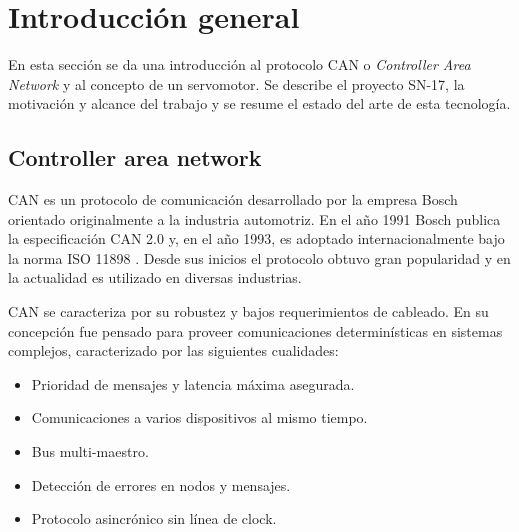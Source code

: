 
\chapter{Introducción general} %

\label{Chapter1} %
\label{IntroGeneral}


\newcommand{\keyword}[1]{\textbf{#1}}
\newcommand{\tabhead}[1]{\textbf{#1}}
\newcommand{\code}[1]{\texttt{#1}}
\newcommand{\file}[1]{\texttt{\bfseries#1}}
\newcommand{\option}[1]{\texttt{\itshape#1}}
\newcommand{\grados}{$^{\circ}$}

En esta sección se da una introducción al protocolo CAN o \textit{Controller Area Network}\citep{web_cia_can} y al concepto de un servomotor. Se describe el proyecto SN-17, la motivación y alcance del trabajo y se resume el estado del arte de esta tecnología.

\section{Controller area network}

CAN es un protocolo de comunicación desarrollado por la empresa Bosch \citep{can_basics_microchip} orientado originalmente a la industria automotriz. En el año 1991 Bosch publica la especificación CAN 2.0 y, en el año 1993, es adoptado internacionalmente bajo la norma ISO 11898 \citep{web_ISO_CAN}. Desde sus inicios el protocolo obtuvo gran popularidad y en la actualidad es utilizado en diversas industrias.

CAN se caracteriza por su robustez y bajos requerimientos de cableado. En su concepción fue pensado para proveer comunicaciones determinísticas en sistemas complejos, caracterizado por las siguientes cualidades\citep{UnderstandingCAN}:
\begin{itemize}
	\item Prioridad de mensajes y latencia máxima asegurada.
	\item Comunicaciones a varios dispositivos al mismo tiempo.	
	\item Bus multi-maestro.
	\item Detección de errores en nodos y mensajes.
	\item Protocolo asincrónico sin línea de clock.
\end{itemize}

